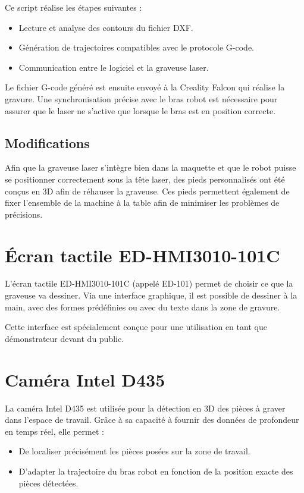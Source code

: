 Ce script réalise les étapes suivantes :
\begin{itemize}
    \item Lecture et analyse des contours du fichier DXF.
    \item Génération de trajectoires compatibles avec le protocole G-code.
    \item Communication entre le logiciel et la graveuse laser.
\end{itemize}

Le fichier G-code généré est ensuite envoyé à la Creality Falcon qui réalise la gravure. Une synchronisation précise avec le bras robot est nécessaire pour assurer que le laser ne s'active que lorsque le bras est en position correcte.

\subsection{Modifications}

Afin que la graveuse laser s'intègre bien dans la maquette et que le robot puisse se positionner correctement sous la tête laser, des pieds personnalisés ont été conçus en 3D afin de réhauser la graveuse. Ces pieds permettent également de fixer l'ensemble de la machine à la table afin de minimiser les problèmes de précisions.

\section{Écran tactile ED-HMI3010-101C}

L’écran tactile ED-HMI3010-101C (appelé ED-101) permet de choisir ce que la graveuse va dessiner. Via une interface graphique, il est possible de dessiner à la main, avec des formes prédéfinies ou avec du texte dans la zone de gravure.

Cette interface est spécialement conçue pour une utilisation en tant que démonstrateur devant du public.

\section{Caméra Intel D435}

La caméra Intel D435 est utilisée pour la détection en 3D des pièces à graver dans l’espace de travail. Grâce à sa capacité à fournir des données de profondeur en temps réel, elle permet :
\begin{itemize}
    \item De localiser précisément les pièces posées sur la zone de travail.
    \item D’adapter la trajectoire du bras robot en fonction de la position exacte des pièces détectées.
\end{itemize}


